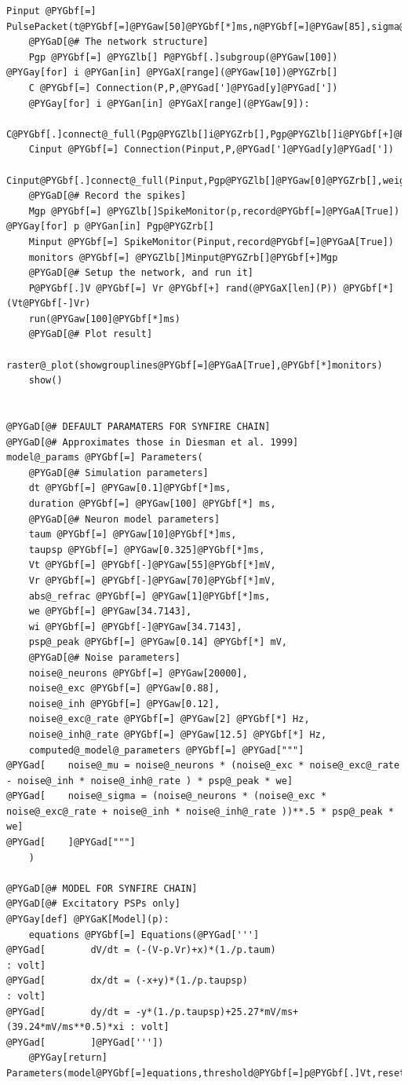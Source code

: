 \documentclass[letterpaper,10pt,english]{manual}
\begin{document}
\begin{Verbatim}[commandchars=@\[\]]
    Pinput @PYGbf[=] PulsePacket(t@PYGbf[=]@PYGaw[50]@PYGbf[*]ms,n@PYGbf[=]@PYGaw[85],sigma@PYGbf[=]@PYGaw[1]@PYGbf[*]ms)
    @PYGaD[@# The network structure]
    Pgp @PYGbf[=] @PYGZlb[] P@PYGbf[.]subgroup(@PYGaw[100]) @PYGay[for] i @PYGan[in] @PYGaX[range](@PYGaw[10])@PYGZrb[]
    C @PYGbf[=] Connection(P,P,@PYGad[']@PYGad[y]@PYGad['])
    @PYGay[for] i @PYGan[in] @PYGaX[range](@PYGaw[9]):
        C@PYGbf[.]connect@_full(Pgp@PYGZlb[]i@PYGZrb[],Pgp@PYGZlb[]i@PYGbf[+]@PYGaw[1]@PYGZrb[],weight)
    Cinput @PYGbf[=] Connection(Pinput,P,@PYGad[']@PYGad[y]@PYGad['])
    Cinput@PYGbf[.]connect@_full(Pinput,Pgp@PYGZlb[]@PYGaw[0]@PYGZrb[],weight)
    @PYGaD[@# Record the spikes]
    Mgp @PYGbf[=] @PYGZlb[]SpikeMonitor(p,record@PYGbf[=]@PYGaA[True]) @PYGay[for] p @PYGan[in] Pgp@PYGZrb[]
    Minput @PYGbf[=] SpikeMonitor(Pinput,record@PYGbf[=]@PYGaA[True])
    monitors @PYGbf[=] @PYGZlb[]Minput@PYGZrb[]@PYGbf[+]Mgp
    @PYGaD[@# Setup the network, and run it]
    P@PYGbf[.]V @PYGbf[=] Vr @PYGbf[+] rand(@PYGaX[len](P)) @PYGbf[*] (Vt@PYGbf[-]Vr)
    run(@PYGaw[100]@PYGbf[*]ms)
    @PYGaD[@# Plot result]
    raster@_plot(showgrouplines@PYGbf[=]@PYGaA[True],@PYGbf[*]monitors)
    show()


@PYGaD[@# DEFAULT PARAMATERS FOR SYNFIRE CHAIN]
@PYGaD[@# Approximates those in Diesman et al. 1999]
model@_params @PYGbf[=] Parameters(
    @PYGaD[@# Simulation parameters]
    dt @PYGbf[=] @PYGaw[0.1]@PYGbf[*]ms,
    duration @PYGbf[=] @PYGaw[100] @PYGbf[*] ms,
    @PYGaD[@# Neuron model parameters]
    taum @PYGbf[=] @PYGaw[10]@PYGbf[*]ms,
    taupsp @PYGbf[=] @PYGaw[0.325]@PYGbf[*]ms,
    Vt @PYGbf[=] @PYGbf[-]@PYGaw[55]@PYGbf[*]mV,
    Vr @PYGbf[=] @PYGbf[-]@PYGaw[70]@PYGbf[*]mV,
    abs@_refrac @PYGbf[=] @PYGaw[1]@PYGbf[*]ms,
    we @PYGbf[=] @PYGaw[34.7143],
    wi @PYGbf[=] @PYGbf[-]@PYGaw[34.7143],
    psp@_peak @PYGbf[=] @PYGaw[0.14] @PYGbf[*] mV,
    @PYGaD[@# Noise parameters]
    noise@_neurons @PYGbf[=] @PYGaw[20000],
    noise@_exc @PYGbf[=] @PYGaw[0.88],
    noise@_inh @PYGbf[=] @PYGaw[0.12],
    noise@_exc@_rate @PYGbf[=] @PYGaw[2] @PYGbf[*] Hz,
    noise@_inh@_rate @PYGbf[=] @PYGaw[12.5] @PYGbf[*] Hz,
    computed@_model@_parameters @PYGbf[=] @PYGad["""]
@PYGad[    noise@_mu = noise@_neurons * (noise@_exc * noise@_exc@_rate - noise@_inh * noise@_inh@_rate ) * psp@_peak * we]
@PYGad[    noise@_sigma = (noise@_neurons * (noise@_exc * noise@_exc@_rate + noise@_inh * noise@_inh@_rate ))**.5 * psp@_peak * we]
@PYGad[    ]@PYGad["""]
    )

@PYGaD[@# MODEL FOR SYNFIRE CHAIN]
@PYGaD[@# Excitatory PSPs only]
@PYGay[def] @PYGaK[Model](p):
    equations @PYGbf[=] Equations(@PYGad[''']
@PYGad[        dV/dt = (-(V-p.Vr)+x)*(1./p.taum)                          : volt]
@PYGad[        dx/dt = (-x+y)*(1./p.taupsp)                               : volt]
@PYGad[        dy/dt = -y*(1./p.taupsp)+25.27*mV/ms+(39.24*mV/ms**0.5)*xi : volt]
@PYGad[        ]@PYGad['''])
    @PYGay[return] Parameters(model@PYGbf[=]equations,threshold@PYGbf[=]p@PYGbf[.]Vt,reset@PYGbf[=]p@PYGbf[.]Vr,refractory@PYGbf[=]p@PYGbf[.]abs@_refrac)


\end{Verbatim}
\end{document}
